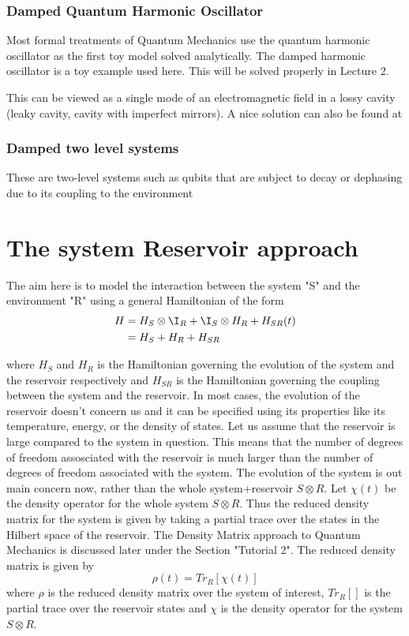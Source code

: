 \documentclass{scrartcl}
\newcommand{\1}{\mathbbm{1}}
\begin{document}
\subsubsection{Damped Quantum Harmonic Oscillator}
Most formal treatments of Quantum Mechanics use the quantum harmonic oscillator as the first toy model solved analytically. The damped harmonic oscillator is a toy example used here. This will be solved properly in Lecture 2.

This can be viewed as a single mode of an electromagnetic field in a lossy cavity (leaky cavity, cavity with imperfect mirrors). A nice solution can also be found at
\subsubsection{Damped two level systems}
These are two-level systems such as qubits that are subject to decay or dephasing due to its coupling to the environment
\section{The system Reservoir approach}
The aim here is to model the interaction between the system "S" and the environment "R" using a general Hamiltonian of the form
\begin{align}
	H & = H_S \otimes \I_R + \I_S \otimes H_R + H_{SR}(t) \\ \nonumber
	  & = H_S + H_R + H_{SR}
\end{align}

where $H_S$ and $H_R$ is the Hamiltonian governing the evolution of the system and the reservoir respectively and $H_{SR}$ is the Hamiltonian governing the coupling between the system and the reservoir. In most cases, the evolution of the reservoir doesn't concern us and it can be specified using its properties like its temperature, energy, or the density of states.
Let us assume that the reservoir is large compared to the system in question. This means that the number of
degrees of freedom assosciated with the reservoir is much larger than the number of degrees of freedom associated with the system.
The evolution of the system is out main concern now, rather than the whole system+reservoir $S \otimes R$. Let $\chi (t)$ be the density operator for the whole system $S\otimes R$. Thus the reduced density matrix for the system is given by taking a partial trace over the states in the Hilbert space of the reservoir. The Density Matrix approach to Quantum Mechanics is discussed later under the Section "Tutorial 2". The reduced density matrix is given by
\begin{equation}
	\rho (t) = Tr_R[\chi (t)]
\end{equation}
where $\rho$ is the reduced density matrix over the system of interest, $Tr_R[]$ is the partial trace over the reservoir states and $\chi$ is the density operator for the system $S\otimes R$.
\end{document}
